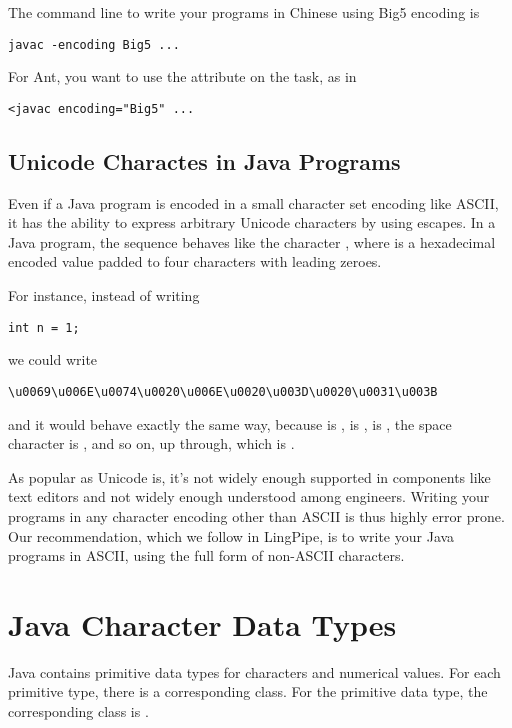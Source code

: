 The command line to write your programs in Chinese using Big5 encoding
is
%
\begin{verbatim}
javac -encoding Big5 ...
\end{verbatim}
%
For Ant, you want to use the  attribute on the
 task, as in
%
\begin{verbatim}
<javac encoding="Big5" ...
\end{verbatim}


\subsection{Unicode Charactes in Java Programs}

Even if a Java program is encoded in a small character set encoding
like ASCII, it has the ability to express arbitrary Unicode characters
by using escapes.  In a Java program, the sequence
  behaves like the character
, where  is a hexadecimal
encoded value padded to four characters with leading zeroes.

For instance, instead of writing

\begin{verbatim}
int n = 1;
\end{verbatim}
%
we could write
%
\begin{verbatim}
\u0069\u006E\u0074\u0020\u006E\u0020\u003D\u0020\u0031\u003B
\end{verbatim}
%
and it would behave exactly the same way, because
 is ,  is
,  is ,
the space character is , and so on, up
through\charmention{;}, which is .

As popular as Unicode is, it's not widely enough supported in
components like text editors and not widely enough understood among
engineers.  Writing your programs in any character encoding other than
ASCII is thus highly error prone.  Our recommendation, which we follow
in LingPipe, is to write your Java programs in ASCII, using the full
 form of non-ASCII characters.


\section{Java Character Data Types}

Java contains primitive data types for characters and numerical
values.  For each primitive type, there is a corresponding
class.  For the primitive  data type, the corresponding
class is .

